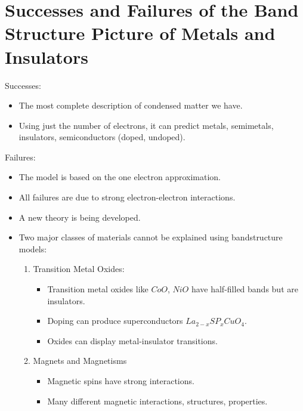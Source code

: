 \documentclass[a4paper, 11pt, normalem]{report}
\begin{document}
\section{Successes and Failures of the Band Structure Picture of Metals and Insulators}
Successes:
\begin{itemize}
    \item The most complete description of condensed matter we have.
    \item Using just the number of electrons, it can predict metals, semimetals, insulators, semiconductors (doped, undoped).
\end{itemize}
Failures:
\begin{itemize}
    \item The model is based on the one electron approximation. 
    \item All failures are due to strong electron-electron interactions. 
    \item A new theory is being developed.
    \item Two major classes of materials cannot be explained using bandstructure models:
        \begin{enumerate}
            \item Transition Metal Oxides:
                \begin{itemize}
                    \item Transition metal oxides like $CoO$, $NiO$ have half-filled bands but are insulators. 
                    \item Doping can produce superconductors $La_{2-x}SP_x CuO_4$.
                    \item Oxides can display metal-insulator transitions. 
                \end{itemize}
            \item Magnets and Magnetisms
                \begin{itemize}
                    \item Magnetic spins have strong interactions. 
                    \item Many different magnetic interactions, structures, properties.
                \end{itemize}
        \end{enumerate}
\end{itemize}
\end{document}
